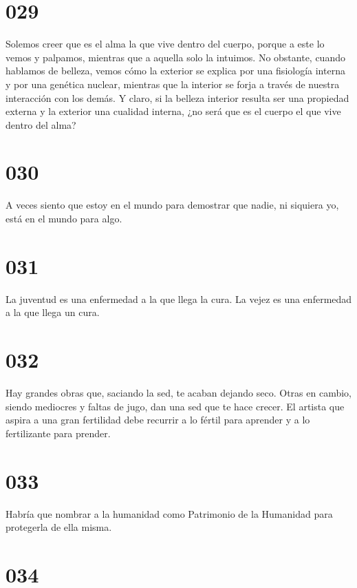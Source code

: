 \documentclass[a4paper,11pt,openright,twocolumn]{book}
\begin{document}
\section*{029}

Solemos creer que es el alma la que vive dentro del cuerpo, porque a este lo vemos y palpamos, mientras que a aquella solo la intuimos. No obstante, cuando hablamos de belleza, vemos cómo la exterior se explica por una fisiología interna y por una genética nuclear, mientras que la interior se forja a través de nuestra interacción con los demás. Y claro, si la belleza interior resulta ser una propiedad externa y la exterior una cualidad interna, ¿no será que es el cuerpo el que vive dentro del alma?

\section*{030}

A veces siento que estoy en el mundo para demostrar que nadie, ni siquiera yo, está en el mundo para algo.

\section*{031}

La juventud es una enfermedad a la que llega la cura. La vejez es una enfermedad a la que llega un cura. 

\section*{032}

Hay grandes obras que, saciando la sed, te acaban dejando seco. Otras en cambio, siendo mediocres y faltas de jugo, dan una sed que te hace crecer. El artista que aspira a una gran fertilidad debe recurrir a lo fértil para aprender y a lo fertilizante para prender. 

\section*{033}

Habría que nombrar a la humanidad como Patrimonio de la Humanidad para protegerla de ella misma. 

\section*{034}
\end{document}
